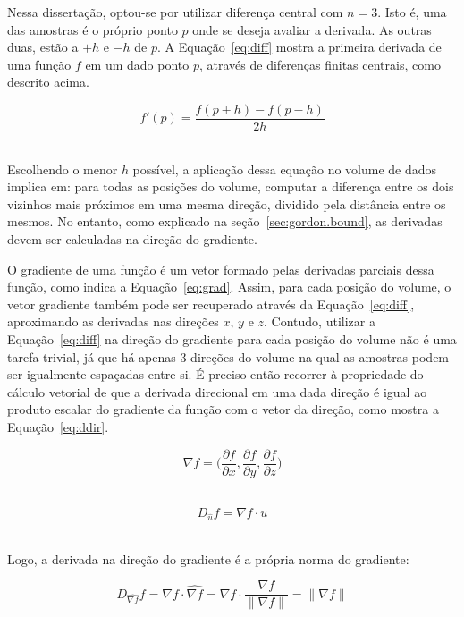 	Nessa dissertação, optou-se por utilizar diferença central com $ n = 3 $. Isto é, uma das amostras é o próprio ponto $ p $ onde se deseja avaliar a derivada. As outras duas, estão a $ +h $ e $ -h $ de $ p $. A Equação~\eqref{eq:diff} mostra a primeira derivada de uma função $ f $ em um dado ponto $ p $, através de diferenças finitas centrais, como descrito acima.
	
\begin{equation}\label{eq:diff}
	f'(p) = \frac{f(p + h) - f(p - h)}{2h}
\end{equation} \

	Escolhendo o menor $ h $ possível, a aplicação dessa equação no volume de dados implica em: para todas as posições do volume, computar a diferença entre os dois vizinhos mais próximos em uma mesma direção, dividido pela distância entre os mesmos. No entanto, como explicado na seção~\ref{sec:gordon.bound}, as derivadas devem ser calculadas na direção do gradiente.
	
	O gradiente de uma função é um vetor formado pelas derivadas parciais dessa função, como indica a Equação~\eqref{eq:grad}. Assim, para cada posição do volume, o vetor gradiente também pode ser recuperado através da Equação~\eqref{eq:diff}, aproximando as derivadas nas direções $ x $, $ y $ e $ z $. Contudo, utilizar a Equação~\eqref{eq:diff} na direção do gradiente para cada posição do volume não é uma tarefa trivial, já que há apenas 3 direções do volume na qual as amostras podem ser igualmente espaçadas entre si. É preciso então recorrer à propriedade do cálculo vetorial de que a derivada direcional em uma dada direção é igual ao produto escalar do gradiente da função com o vetor da direção, como mostra a Equação~\eqref{eq:ddir}.
	
\begin{equation}\label{eq:grad}
	\nabla f = \bigg(\frac{\partial f}{\partial x}, \frac{\partial f}{\partial y}, \frac{\partial f}{\partial z}\bigg)
\end{equation} \

\begin{equation}\label{eq:ddir}
D_{\widehat{u}} f = \nabla f \cdot u
\end{equation} \

	Logo, a derivada na direção do gradiente é a própria norma do gradiente:

\begin{equation}\label{eq:first_derivative}
	D_{\widehat{\nabla f}} f = \nabla f \cdot \widehat{\nabla f} = \nabla f \cdot \frac{\nabla f}{\|\nabla f\|} = \|\nabla f\|
\end{equation} \

